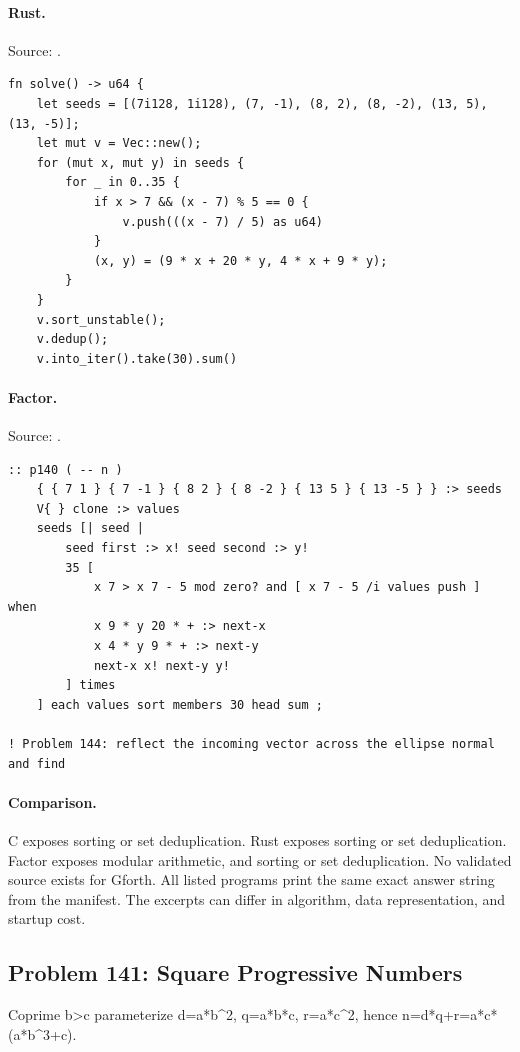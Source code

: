 \paragraph{Rust.} Source: .
\begin{lstlisting}
fn solve() -> u64 {
    let seeds = [(7i128, 1i128), (7, -1), (8, 2), (8, -2), (13, 5), (13, -5)];
    let mut v = Vec::new();
    for (mut x, mut y) in seeds {
        for _ in 0..35 {
            if x > 7 && (x - 7) % 5 == 0 {
                v.push(((x - 7) / 5) as u64)
            }
            (x, y) = (9 * x + 20 * y, 4 * x + 9 * y);
        }
    }
    v.sort_unstable();
    v.dedup();
    v.into_iter().take(30).sum()
\end{lstlisting}

\paragraph{Factor.} Source: .
\begin{lstlisting}
:: p140 ( -- n )
    { { 7 1 } { 7 -1 } { 8 2 } { 8 -2 } { 13 5 } { 13 -5 } } :> seeds
    V{ } clone :> values
    seeds [| seed |
        seed first :> x! seed second :> y!
        35 [
            x 7 > x 7 - 5 mod zero? and [ x 7 - 5 /i values push ] when
            x 9 * y 20 * + :> next-x
            x 4 * y 9 * + :> next-y
            next-x x! next-y y!
        ] times
    ] each values sort members 30 head sum ;

! Problem 144: reflect the incoming vector across the ellipse normal and find
\end{lstlisting}

\paragraph{Comparison.}
C exposes sorting or set deduplication. Rust exposes sorting or set deduplication. Factor exposes modular arithmetic, and sorting or set deduplication.
No validated source exists for Gforth.
All listed programs print the same exact answer string from the manifest. The excerpts can differ in algorithm, data representation, and startup cost.

\subsection{Problem 141: Square Progressive Numbers}
\label{walkthrough:p141}
Coprime b>c parameterize d=a*b\textasciicircum{}2, q=a*b*c, r=a*c\textasciicircum{}2, hence n=d*q+r=a*c*(a*b\textasciicircum{}3+c).

